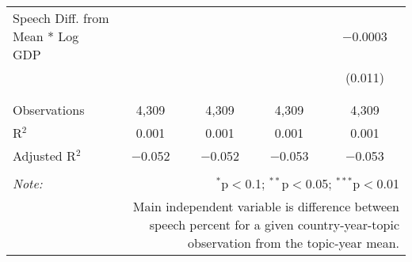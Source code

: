 \begin{table}[!htbp]
\begin{tabular}{@{\extracolsep{5pt}}lcccc}
 Speech Diff. from Mean * Log GDP &  &  &  & $-$0.0003 \\ 
  &  &  &  & (0.011) \\ 
  & & & & \\ 
\hline \\[-1.8ex] 
Observations & 4,309 & 4,309 & 4,309 & 4,309 \\ 
R$^{2}$ & 0.001 & 0.001 & 0.001 & 0.001 \\ 
Adjusted R$^{2}$ & $-$0.052 & $-$0.052 & $-$0.053 & $-$0.053 \\ 
\hline 
\hline \\[-1.8ex] 
\textit{Note:}  & \multicolumn{4}{r}{$^{*}$p$<$0.1; $^{**}$p$<$0.05; $^{***}$p$<$0.01} \\ 
 & \multicolumn{4}{r}{Main independent variable is difference between speech percent for a given country-year-topic observation from the topic-year mean.} \\ 
\end{tabular} 
\end{table} 

